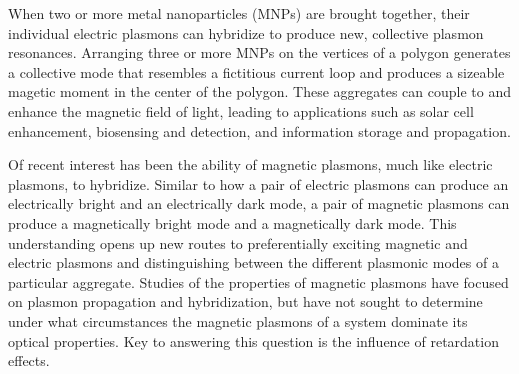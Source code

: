 \documentclass[journal=apchd5,manuscript=article]{achemso}
\begin{document}
When two or more metal nanoparticles (MNPs) are brought together, their individual electric plasmons can hybridize to produce new, collective plasmon resonances\cite{Lucas1976,ARAVIND1981,Xu1995,Mischenko1995}. Arranging three or more MNPs on the vertices of a polygon generates a collective mode that resembles a fictitious current loop and produces a sizeable magetic moment in the center of the polygon\cite{Alu2006,Alu2008,Liu2011,Nord2006,Cherqui2014}. These aggregates can couple to and enhance the magnetic field of light, leading to applications such as solar cell enhancement\cite{Graydon2011,Alu2014solar,Le2015solar}, biosensing and detection\cite{Zia2010trans,Noginova2008trans,Wang:13,Fan2015,Wei2015,Shvets2012,Altug2012bio,Nord2011fano}, and information storage and propagation\cite{Zhang2006,NordHal2011,NordHal2012}.

Of recent interest has been the ability of magnetic plasmons, much like electric plasmons, to hybridize\cite{Cherqui2016}. Similar to how a pair of electric plasmons can produce an electrically bright and an electrically dark mode, a pair of magnetic plasmons can produce a magnetically bright mode and a magnetically dark mode. This understanding opens up new routes to preferentially exciting magnetic and electric plasmons and distinguishing between the different plasmonic modes of a particular aggregate. Studies of the properties of magnetic plasmons have focused on plasmon propagation and hybridization, but have not sought to determine under what circumstances the magnetic plasmons of a system dominate its optical properties. Key to answering this question is the influence of retardation effects.
\end{document}

